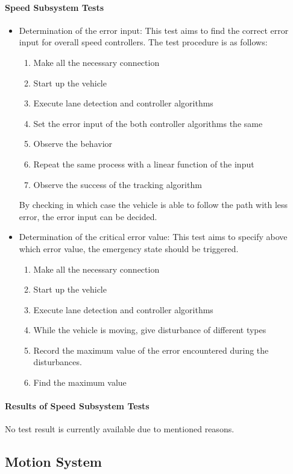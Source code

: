 \documentclass[a4paper,12pt]{article}
\begin{document}
	\paragraph{Speed Subsystem Tests}
	\begin{itemize}
		\item Determination of the error input: This test aims to find the correct error input for overall speed controllers. The test procedure is as follows:
		\begin{enumerate}
			\item Make all the necessary connection
			\item Start up the vehicle
			\item Execute lane detection and controller algorithms
			\item Set the error input of the both controller algorithms the same
			\item Observe the behavior
			\item Repeat the same process with a linear function of the input
			\item Observe the success of the tracking algorithm
		\end{enumerate}
		By checking in which case the vehicle is able to follow the path with less error, the error input can be decided.

		\item Determination of the critical error value: This test aims to specify above which error value, the emergency state should be triggered.
		\begin{enumerate}
			\item Make all the necessary connection
			\item Start up the vehicle
			\item Execute lane detection and controller algorithms
			\item While the vehicle is moving, give disturbance of different types
			\item Record the maximum value of the error encountered during the disturbances.
			\item Find the maximum value
		\end{enumerate}
		\end{itemize}
	\paragraph{Results of Speed Subsystem Tests}
	No test result is currently available due to mentioned reasons.

	\subsection{Motion System}
	
\end{document}
